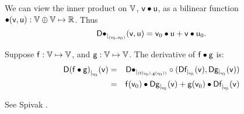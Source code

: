 \label{sec:derivatives-of-inner-products}

We can view the inner product on $\mathbb{V}$, $\mathsf{v} \bullet \mathsf{u}$,
as a bilinear function $\bullet(\mathsf{v},\mathsf{u}) : \mathbb{V} \oplus \mathbb{V} \mapsto \mathbb{R}$.
Thus
\begin{equation}
{\mathsf{D}{\bullet}_{\mid_{(\mathsf{v}_0,\mathsf{u}_0)}}({\mathsf{v},\mathsf{u}})} = \mathsf{v}_0 \bullet \mathsf{u} + \mathsf{v} \bullet \mathsf{u}_0.
\end{equation}

Suppose
$\mathsf{f}:\mathbb{V} \mapsto \mathbb{V}$, and
$\mathsf{g}:\mathbb{V} \mapsto \mathbb{V}$.
The derivative of $\mathsf{f} \bullet \mathsf{g}$ is:
\begin{eqnarray}
\label{eq:dot_derivative}
\Dc{(\f \bullet \g)}{\v_0}{\v}
& =
& \Db{\bullet}{(\f(\v_0),\g(\v_0))} \circ (\Dc{\f}{\v_0}{\v}, \Dc{\g}{\v_0}{\v})
\\
& =
& \f(\v_0) \bullet \Dc{\g}{\v_0}{\v}  +  \g(\v_0) \bullet \Dc{\f}{\v_0}{\v} \nonumber
\end{eqnarray}

See Spivak \cite[ex.~2-13]{spivak-1965}.

\label{sec:derivatives-of-angles}

